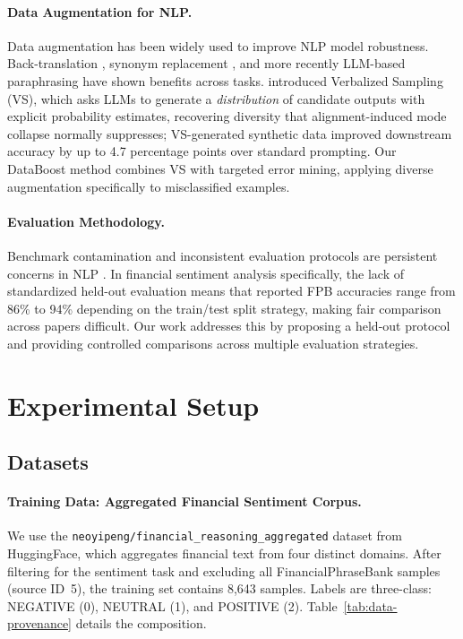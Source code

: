 \documentclass[11pt]{article}
\begin{document}
\paragraph{Data Augmentation for NLP.}
Data augmentation has been widely used to improve NLP model robustness. Back-translation \citep{sennrich2016improving}, synonym replacement \citep{wei2019eda}, and more recently LLM-based paraphrasing \citep{dai2023chataug} have shown benefits across tasks. \citet{zhang2025verbalized} introduced Verbalized Sampling (VS), which asks LLMs to generate a \emph{distribution} of candidate outputs with explicit probability estimates, recovering diversity that alignment-induced mode collapse normally suppresses; VS-generated synthetic data improved downstream accuracy by up to 4.7 percentage points over standard prompting. Our DataBoost method combines VS with targeted error mining, applying diverse augmentation specifically to misclassified examples.

\paragraph{Evaluation Methodology.}
Benchmark contamination and inconsistent evaluation protocols are persistent concerns in NLP \citep{jacovi2023stop}. In financial sentiment analysis specifically, the lack of standardized held-out evaluation means that reported FPB accuracies range from 86\% to 94\% depending on the train/test split strategy, making fair comparison across papers difficult. Our work addresses this by proposing a held-out protocol and providing controlled comparisons across multiple evaluation strategies.

\section{Experimental Setup}
\label{sec:setup}

\subsection{Datasets}

\paragraph{Training Data: Aggregated Financial Sentiment Corpus.}
We use the \texttt{neoyipeng/financial\_reasoning\_aggregated} dataset from HuggingFace, which aggregates financial text from four distinct domains. After filtering for the sentiment task and excluding all FinancialPhraseBank samples (source ID~5), the training set contains 8,643 samples. Labels are three-class: NEGATIVE (0), NEUTRAL (1), and POSITIVE (2). Table~\ref{tab:data-provenance} details the composition.
\end{document}
